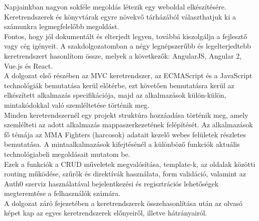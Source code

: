 
Napjainkban nagyon sokféle megoldás létezik egy weboldal elkészítésére. Keretrendszerek és könyvtárak egyre növekvő tárházából választhatjuk ki a számunkra legmegfelelőbb megoldást.\\ Fontos, hogy jól dokumentált és elterjedt legyen, továbbá kiszolgálja a fejlesztő vagy cég igényeit. A szakdolgozatomban a négy legnépszerűbb és legelterjedtebb keretrendszert hasonlítom össze, melyek a következők: AngularJS, Angular 2, Vue.js és React.\\ A dolgozat első részében az MVC keretrendszer, az ECMAScript és a JavaScript technológiák bemutatása kerül előtérbe, ezt követően bemutatásra kerül az elkészített alkalmazás specifikációja, majd az alkalmazások külön-külön, mintakódokkal való szemléltetése történik meg.\\ Minden keretrendszernél egy projekt struktúra hozzáadása történik meg, amely szemlélteti az adott alkalmazás mappaszerkezetének felépítését.
Az alkalmazások fő témája az MMA Fighters (harcosok) adatait kezelő webes felületek részletes bemutatása. A mintaalkalmazások kifejtésénél a különböző funkciók aktuális technológiabeli megoldásait mutatom be.\\Ezek a funkciók a CRUD műveletek megvalósítása, template-k, az oldalak közötti routing működése, szűrők és direktívák használata, form validáció, valamint az Auth0 szerviz használatával bejelentkezési és regisztrációs lehetőségek megteremtése a felhasználók számára.\\ A dolgozat záró fejezetében a keretrendszerek összehasonlítása után az olvasó képet kap az egyes keretrendszerek előnyeiről, illetve hátrányairól.